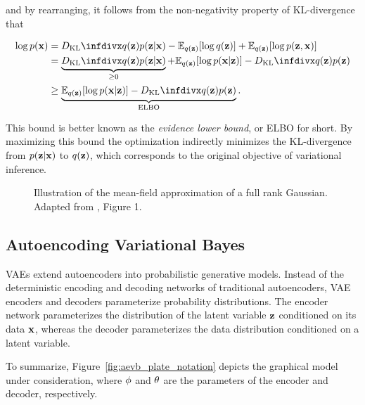 and by rearranging, it follows from the non-negativity property of KL-divergence that

\begin{equation}
\begin{aligned}
\log p(\bx) &= \dkl{q(\bz)}{p(\bz \vert \bx)} - \mathbb{E}_{q(\bz)}[\log q(\bz)] + \mathbb{E}_{q(\bz)}[\log p(\bz, \bx)] \\
            &= \underbrace{\dkl{q(\bz)}{p(\bz \vert \bx)}}_{\geq 0} + \mathbb{E}_{q(\bz)}[\log p(\bx \vert \bz)] - \dkl{q(\bz)}{p(\bz)} \\
            &\geq \underbrace{\mathbb{E}_{q(\bz)}[\log p(\bx \vert \bz)] - \dkl{q(\bz)}{p(\bz)}}_{\text{ELBO}}.
\end{aligned}
\end{equation}

This bound is better known as the \textit{evidence lower bound}, or ELBO for short. By maximizing this bound the optimization indirectly minimizes the KL-divergence from $p(\mathbf{z} \vert \mathbf{x})$ to $q(\mathbf{z})$, which corresponds to the original objective of variational inference.

\begin{figure}[!htb]
  \centering
  \resizebox{0.5\textwidth}{!}{\unskip}
  \caption{Illustration of the mean-field approximation of a full rank Gaussian. Adapted from \cite{variational_inference_review}, Figure 1.}
  \label{fig:mean_field_approximation}
\end{figure}

\subsection{Autoencoding Variational Bayes}

VAEs extend autoencoders into probabilistic generative models. Instead of the deterministic encoding and decoding networks of traditional autoencoders, VAE encoders and decoders parameterize probability distributions. The encoder network parameterizes the distribution of the latent variable $\mathbf{z}$ conditioned on its data $\mathbf{x}$, whereas the decoder parameterizes the data distribution conditioned on a latent variable.


To summarize, Figure~\ref{fig:aevb_plate_notation} depicts the graphical model under consideration, where $\phi$ and $\theta$ are the parameters of the encoder and decoder, respectively.

